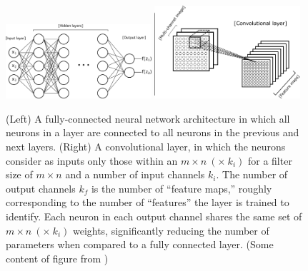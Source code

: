 \documentclass[11pt,a4paper]{article}
\begin{document}
\begin{figure}[!htb]
	\centering
	\includegraphics[width= 0.48\textwidth]{fig/general_nn_fc.pdf}
	\includegraphics[width= 0.48\textwidth]{fig/cnn_example.pdf}
	\caption{(Left) A fully-connected neural network architecture in which all neurons in a layer are connected to all neurons in the previous and next layers. (Right) A convolutional layer, in which the neurons consider as inputs only those within an $m \times n ~(\times ~k_i)$ for a filter size of $m \times n$ and a number of input channels $k_i$. The number of output channels $k_f$ is the number of ``feature maps,'' roughly corresponding to the number of ``features'' the layer is trained to identify. Each neuron in each output channel shares the same set of $m \times n ~(\times ~k_i)$ weights, significantly reducing the number of parameters when compared to a fully connected layer. (Some content of figure from \cite{NEXT_DNN})} \label{fig.nets}
\end{figure}
\end{document}
